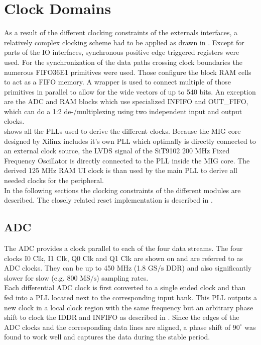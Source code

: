 \section{Clock Domains}
\label{sec:fpga_clocks}

As a result of the different clocking constraints of the externals interfaces,
a relatively complex clocking scheme had to be applied as drawn in
. Except for parts of the \gls{IO} interfaces,
synchronous positive edge triggered registers were used. For the synchronization
of the data paths crossing clock boundaries the numerous FIFO36E1 primitives
were used. Those configure the block \gls{RAM} cells to act as a \gls{FIFO}
memory. A wrapper is used to connect multiple of those primitives 
in parallel to allow for the wide vectors of up to 540 bits.
An exception are the \gls{ADC} and \gls{RAM} blocks which use
specialized \gls{INFIFO} and OUT\_FIFO, which can do a 1:2 de-/multiplexing
using two independent input and output clocks. \\

 shows all the \glspl{PLL} used to derive the
different clocks. Because the \gls{MIG} core designed by Xilinx includes
it's own \gls{PLL} which optimally is directly connected to an external
clock source, the \gls{LVDS} signal of the SiT9102 200 MHz Fixed Frequency
Oscillator is directly connected to the \gls{PLL} inside the \gls{MIG} core.
The derived 125 MHz \gls{RAM} \gls{UI} clock is than used by the main
\gls{PLL} to derive all needed clocks for the peripheral. \\

In the following sections the clocking constraints of the different modules
are described. The closely related reset implementation is described
in . \\

\subsection{\gls{ADC}}
The \gls{ADC} provides a clock parallel to each of the four data streams.
The four clocks I0 Clk, I1 Clk, Q0 Clk and Q1 Clk are shown on
 and are referred to as \gls{ADC} clocks.
They can be up to 450 MHz (1.8 $\text{GS}/\text{s}$ \gls{DDR})
and also significantly slower for slow (e.g. 800 $\text{MS}/\text{s}$)
sampling rates. \\

Each differential \gls{ADC} clock is first converted to a single ended
clock and than fed into a \gls{PLL} located next to the corresponding input
bank. This \gls{PLL} outputs a new clock in a local clock region
with the same frequency but an arbitrary phase shift
to clock the \gls{IDDR} and \gls{INFIFO} as described in .
Since the edges of the \gls{ADC} clocks and the corresponding data lines
are aligned, a phase shift of $90^\circ$ was found to work well and captures
the data during the stable period. \\

